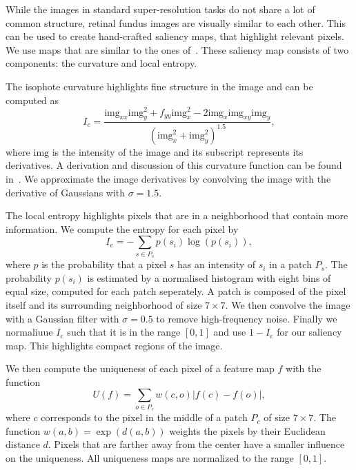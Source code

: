 \documentclass{scrartcl}
\begin{document}
While the images in standard super-resolution tasks do not share a lot of common structure, retinal fundus images are visually similar to each other.
This can be used to create hand-crafted saliency maps, that highlight relevant pixels.
We use maps that are similar to the ones of~\cite{SaliencyGAN}.
These saliency map consists of two components: the curvature and local entropy.

The isophote curvature highlights fine structure in the image and can be computed as
\newcommand{\img}{\mathrm{img}} %
\begin{equation}
 I_c = \frac{\img_{xx} \img_y^2 + f_{yy} \img_x^2 - 2 \img_{x} \img_{xy} \img_{y} }{(\img_x^2 + \img_y^2)^{1.5}},
\end{equation}
where \(\img\) is the intensity of the image and its subscript represents its derivatives.
A derivation and discussion of this curvature function can be found in~\cite{Curvature}.
We approximate the image derivatives by convolving the image with the derivative of Gaussians with \(\sigma = 1.5\).

The local entropy highlights pixels that are in a neighborhood that contain more information.
We compute the entropy for each pixel by
\begin{equation}
  \label{eq:entr}
  I_e = - \sum_{s \in P_s} p(s_i) \log(p(s_i)),
\end{equation}
where \(p\) is the probability that a pixel \(s\) has an intensity of \(s_i\) in a patch \(P_s\).
The probability $p(s_i)$ is estimated by a normalised histogram with eight bins of equal size, computed for each patch seperately.
A patch is composed of the pixel itself and its surrounding neighborhood of size \(7 \times 7\).
We then convolve the image with a Gaussian filter with \(\sigma = 0.5\) to remove high-frequency noise.
Finally we normaliuue $I_e$ such that it is in the range \([0, 1]\) and use $1 - I_e$ for our saliency map.
This highlights compact regions of the image.

We then compute the uniqueness of each pixel of a feature map \(f\) with the function
\begin{equation}
  \label{eq:uniq}
  U(f) = \sum_{o \in P_c} w(c, o) \vert f(c) - f(o) \vert,
\end{equation}
where \(c\) corresponds to the pixel in the middle of a patch \(P_c\) of size \(7 \times 7\).
The function \(w(a,b) = \exp(d(a, b))\) weights the pixels by their Euclidean distance \(d\).
Pixels that are farther away from the center have a smaller influence on the uniqueness.
All uniqueness maps are normalized to the range \([0,1]\).
\end{document}

